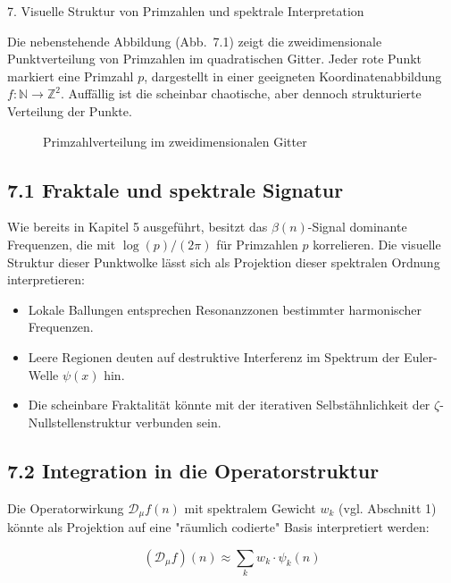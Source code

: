 \documentclass[12pt]{article}
\begin{document}
\vspace{1em}

{7. Visuelle Struktur von Primzahlen und spektrale Interpretation}

Die nebenstehende Abbildung (Abb.~7.1) zeigt die zweidimensionale Punktverteilung von Primzahlen im quadratischen Gitter. Jeder rote Punkt markiert eine Primzahl \(p\), dargestellt in einer geeigneten Koordinatenabbildung \(f: \mathbb{N} \rightarrow \mathbb{Z}^2\). Auffällig ist die scheinbar chaotische, aber dennoch strukturierte Verteilung der Punkte.

\begin{figure}[h!]
\centering
\caption{Primzahlverteilung im zweidimensionalen Gitter}
\label{fig:primegrid}
\end{figure}

\subsection*{7.1 Fraktale und spektrale Signatur}

Wie bereits in Kapitel 5 ausgeführt, besitzt das \(\beta(n)\)-Signal dominante Frequenzen, die mit \(\log(p)/(2\pi)\) für Primzahlen \(p\) korrelieren. Die visuelle Struktur dieser Punktwolke lässt sich als Projektion dieser spektralen Ordnung interpretieren:

\begin{itemize}
  \item Lokale Ballungen entsprechen Resonanzzonen bestimmter harmonischer Frequenzen.
  \item Leere Regionen deuten auf destruktive Interferenz im Spektrum der Euler-Welle \(\psi(x)\) hin.
  \item Die scheinbare Fraktalität könnte mit der iterativen Selbstähnlichkeit der \(\zeta\)-Nullstellenstruktur verbunden sein.
\end{itemize}

\subsection*{7.2 Integration in die Operatorstruktur}

Die Operatorwirkung \(\mathcal{D}_\mu f(n)\) mit spektralem Gewicht \(w_k\) (vgl. Abschnitt 1) könnte als Projektion auf eine "räumlich codierte" Basis interpretiert werden:

\[
(\mathcal{D}_\mu f)(n) \approx \sum_k w_k \cdot \psi_k(n)
\]
\end{document}
